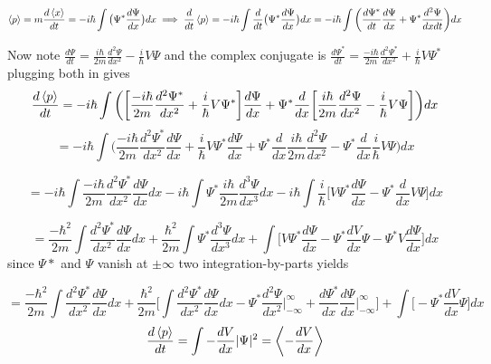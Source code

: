 \documentclass[12pt]{exam}
\begin{document}
\begin{solution}
    $$\expval{p} = m\frac{d\expval{x}}{dt} = -i\hbar \int \big(\Psi^*\frac{d\Psi}{dx}\big)dx \implies \frac{d}{dt}\expval{p} = -i\hbar \int \frac{d}{dt}\big(\Psi^*\frac{d\Psi}{dx}\big)dx = -i\hbar \int \bigg(\frac{d\Psi^*}{dt}\frac{d\Psi}{dx} + \Psi^*\frac{d^2\Psi}{dxdt}\bigg)dx$$
    
    Now note $\frac{d\Psi}{dt} = \frac{i\hbar}{2m}\frac{d^2\Psi}{dx^2} - \frac{i}{\hbar}V\Psi$ and the complex conjugate is $\frac{d\Psi^*}{dt} = \frac{-i\hbar}{2m}\frac{d^2\Psi^*}{dx^2} + \frac{i}{\hbar}V\Psi^*$ plugging both in gives
    $$\frac{d\expval{p}}{dt} = -i\hbar \int \bigg(\bigg[\frac{-i\hbar}{2m}\frac{d^2\Psi^*}{dx^2} + \frac{i}{\hbar}V\Psi^*\bigg]\frac{d\Psi}{dx} + \Psi^*\frac{d}{dx}\bigg[\frac{i\hbar}{2m}\frac{d^2\Psi}{dx^2} - \frac{i}{\hbar}V\Psi\bigg]\bigg)dx $$
    $$= -i\hbar \int \bigg(\frac{-i\hbar}{2m}\frac{d^2\Psi^*}{dx^2}\frac{d\Psi}{dx} + \frac{i}{\hbar}V\Psi^*\frac{d\Psi}{dx} + \Psi^*\frac{d}{dx}\frac{i\hbar}{2m}\frac{d^2\Psi}{dx^2} - \Psi^*\frac{d}{dx}\frac{i}{\hbar}V\Psi\bigg)dx$$
    
    $$= -i\hbar \int \frac{-i\hbar}{2m}\frac{d^2\Psi^*}{dx^2}\frac{d\Psi}{dx} dx -i\hbar \int \Psi^*\frac{i\hbar}{2m}\frac{d^3\Psi}{dx^3} dx  -i\hbar \int\frac{i}{\hbar}\bigg[V\Psi^*\frac{d\Psi}{dx}   - \Psi^*\frac{d}{dx}V\Psi\bigg]dx$$

    $$=  \frac{-\hbar^2}{2m}\int \frac{d^2\Psi^*}{dx^2}\frac{d\Psi}{dx}dx + \frac{\hbar^2}{2m}\int\Psi^*\frac{d^3\Psi}{dx^3} dx + \int\bigg[V\Psi^*\frac{d\Psi}{dx}   - \Psi^*\frac{dV}{dx}\Psi -\Psi^*V\frac{d\Psi}{dx}\bigg]dx$$ 
    since $\Psi*$ and $\Psi$ vanish at $\pm \infty$ two integration-by-parts yields
    
    $$=  \frac{-\hbar^2}{2m}\int \frac{d^2\Psi^*}{dx^2}\frac{d\Psi}{dx}dx + \frac{\hbar^2}{2m} \bigg[\int \frac{d^2\Psi^*}{dx^2}\frac{d\Psi}{dx}dx - \Psi^*\frac{d^2\Psi}{dx^2}\bigg|^\infty_{-\infty} + \frac{d\Psi^*}{dx}\frac{d\Psi}{dx}\bigg|^\infty_{-\infty}\bigg]+ \int\bigg[ - \Psi^*\frac{dV}{dx}\Psi \bigg]dx$$
    $$\frac{d\expval{p}}{dt} = \int -\frac{dV}{dx}|\Psi|^2 = \expval{-\frac{dV}{dx}}$$
\end{solution}
\end{document}
